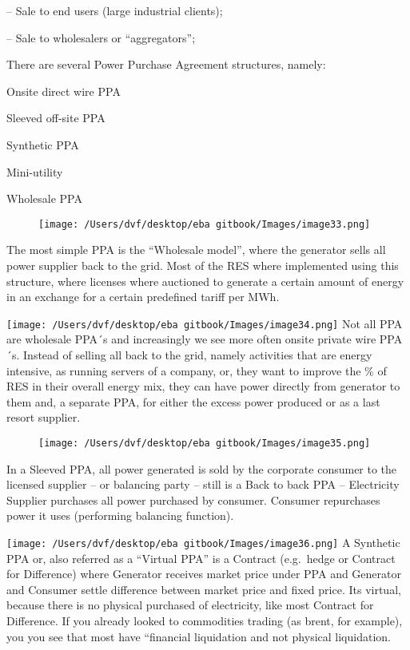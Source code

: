 \documentclass[]{book}
\theoremstyle{definition}
\theoremstyle{definition}
\theoremstyle{definition}
\theoremstyle{remark}
\begin{document}
-- Sale to end users (large industrial clients);

-- Sale to wholesalers or ``aggregators'';

There are several Power Purchase Agreement structures, namely:

Onsite direct wire PPA

Sleeved off-site PPA

Synthetic PPA

Mini-utility

Wholesale PPA

\begin{figure}[htbp]
\centering
\texttt{[image: /Users/dvf/desktop/eba gitbook/Images/image33.png]}
\caption{}
\end{figure}

The most simple PPA is the ``Wholesale model'', where the generator
sells all power supplier back to the grid. Most of the RES where
implemented using this structure, where licenses where auctioned to
generate a certain amount of energy in an exchange for a certain
predefined tariff per MWh.

\texttt{[image: /Users/dvf/desktop/eba gitbook/Images/image34.png]}
Not all PPA are wholesale PPA´s and increasingly we see more often
onsite private wire PPA´s. Instead of selling all back to the grid,
namely activities that are energy intensive, as running servers of a
company, or, they want to improve the \% of RES in their overall energy
mix, they can have power directly from generator to them and, a separate
PPA, for either the excess power produced or as a last resort supplier.

\begin{figure}[htbp]
\centering
\texttt{[image: /Users/dvf/desktop/eba gitbook/Images/image35.png]}
\caption{}
\end{figure}

In a Sleeved PPA, all power generated is sold by the corporate consumer
to the licensed supplier -- or balancing party -- still is a Back to
back PPA -- Electricity Supplier purchases all power purchased by
consumer. Consumer repurchases power it uses (performing balancing
function).

\texttt{[image: /Users/dvf/desktop/eba gitbook/Images/image36.png]}
A Synthetic PPA or, also referred as a ``Virtual PPA'' is a Contract
(e.g.~hedge or Contract for Difference) where Generator receives market
price under PPA and Generator and Consumer settle difference between
market price and fixed price. Its virtual, because there is no physical
purchased of electricity, like most Contract for Difference. If you
already looked to commodities trading (as brent, for example), you you
see that most have ``financial liquidation and not physical liquidation.
\end{document}
